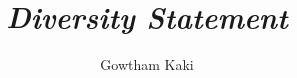 \documentclass[11pt]{article}
\date{}
\begin{document}
\title{\itshape\color{MidnightBlue} Diversity Statement}

\author{Gowtham Kaki}

\maketitle




{
}


\small

\end{document}
